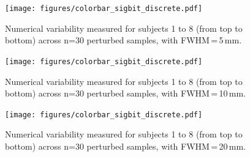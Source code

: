 \documentclass[lettersize,journal]{IEEEtran}
\newcommand{\fmriprep}{\emph{fMRIPrep}\xspace}
\begin{document}
{\begin{figure}
  \centering
  \vspace*{-20pt}\hspace{15pt}
  \texttt{[image: figures/colorbar\_sigbit\_discrete.pdf]}
  \caption{Numerical variability measured for subjects 1 to 8 (from top to bottom) across n=30 perturbed samples, with FWHM\,=\,5\,mm. }
  \label{fig:uncertainty-maps-5mm-disc}
\end{figure}

\begin{figure}
  \vspace*{-2cm}
  \centering
  \vspace*{-20pt}\hspace{15pt}
  \texttt{[image: figures/colorbar\_sigbit\_discrete.pdf]}
  \caption{Numerical variability measured for subjects 1 to 8 (from top to bottom) across n=30 perturbed samples, with FWHM\,=\,10\,mm. }
  \label{fig:uncertainty-maps-10mm-disc}
\end{figure}

\begin{figure}
  \vspace*{-2cm}
  \centering
  \vspace*{-20pt}\hspace{15pt}
  \texttt{[image: figures/colorbar\_sigbit\_discrete.pdf]}
  \caption{Numerical variability measured for subjects 1 to 8 (from top to bottom) across n=30 perturbed samples, with FWHM\,=\,20\,mm. }
  \label{fig:uncertainty-maps-20mm-disc}
\end{figure}





}
\end{document}
